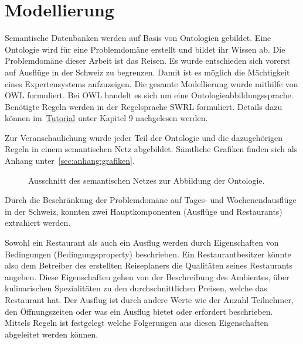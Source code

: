 \section{Modellierung}
\label{sec:loesung_modellierung}

Semantische Datenbanken werden auf Basis von Ontologien gebildet. Eine Ontologie wird für eine Problemdomäne erstellt und bildet ihr Wissen ab. Die Problemdomäne dieser Arbeit ist das Reisen. Es wurde entschieden sich vorerst auf Ausflüge in der Schweiz zu begrenzen. Damit ist es möglich die Mächtigkeit eines Expertensystems aufzuzeigen. Die gesamte Modellierung wurde mithilfe von OWL formuliert. Bei OWL handelt es sich um eine Ontologieabbildungssprache. Benötigte Regeln werden in der Regelsprache SWRL formuliert. Details dazu können im~\hyperref[sec:anhang:tutorial_dokument]{Tutorial} unter Kapitel 9 nachgelesen werden.

Zur Veranschaulichung wurde jeder Teil der Ontologie und die dazugehörigen Regeln in einem semantischen Netz abgebildet. Sämtliche Grafiken finden sich als Anhang unter~\ref{sec:anhang:grafiken}.

\begin{figure}[H]
\centering {}
\caption{Ausschnitt des semantischen Netzes zur Abbildung der Ontologie.\label{fig:semNetzLoesung}\protect\footnotemark}
\end{figure}


Durch die Beschränkung der Problemdomäne auf Tages- und Wochenendausflüge in der Schweiz, konnten zwei Hauptkomponenten (Ausflüge und Restaurants) extrahiert werden.

Sowohl ein Restaurant als auch ein Ausflug werden durch Eigenschaften von Bedingungen (Bedingungsproperty) beschrieben. Ein Restaurantbesitzer könnte also dem Betreiber des erstellten Reiseplaners die Qualitäten seines Restaurants angeben. Diese Eigenschaften gehen von der Beschreibung des Ambientes, über kulinarischen Spezialitäten zu den durchschnittlichen Preisen, welche das Restaurant hat. Der Ausflug ist durch andere Werte wie der Anzahl Teilnehmer, den Öffnungszeiten oder was ein Ausflug bietet oder erfordert beschrieben.
Mittels Regeln ist festgelegt welche Folgerungen aus diesen Eigenschaften abgeleitet werden können.

